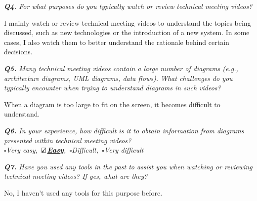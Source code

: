 \vspace*{1em}\noindent\textit{\textbf{Q4.} For what purposes do you typically watch or review technical meeting videos?
}
\begin{samepage}
\begin{mdframed}[style=MyFrame]
I mainly watch or review technical meeting videos to understand the topics being discussed, such as new technologies or the introduction of a new system. In some cases, I also watch them to better understand the rationale behind certain decisions.
\end{mdframed}
\end{samepage}



\vspace*{1em}\noindent\textit{\textbf{Q5.} Many technical meeting videos contain a large number of diagrams (e.g., architecture diagrams, UML diagrams, data flows). 
What challenges do you typically encounter when trying to understand diagrams in such videos?
}
\begin{samepage}
\begin{mdframed}[style=MyFrame]
When a diagram is too large to fit on the screen, it becomes difficult to understand.
\end{mdframed}
\end{samepage}


\vspace*{1em}\noindent\textit{\textbf{Q6.} In your experience, how difficult is it to obtain information from diagrams presented within  technical meeting videos?
\\[.5em]
        \indent $\square$Very easy,\,
        \underline{\bfseries$\text{\rlap{$\checkmark$}}\square$Easy},\,
        $\square$Difficult,\,
        $\square$Very difficult
}



\vspace*{1em}\noindent\textit{\textbf{Q7.} Have you used any tools in the past to assist you when watching or reviewing technical meeting videos? If yes, what are they?
}


\begin{samepage}
\begin{mdframed}[style=MyFrame]
No, I haven't used any tools for this purpose before.
\end{mdframed}
\end{samepage}




